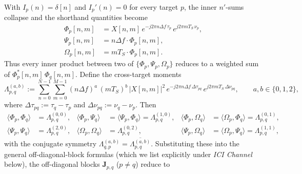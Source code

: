 \documentclass[11pt]{article}
\begin{document}
With \(I_p(n) = \delta[n]\) and \(I_p'(n) = 0\) for every target \(p\), the inner \(n'\)-sums collapse and the shorthand quantities become
\begin{align}
    \Phi_p[n,m]   &= X[n,m]\, e^{-j2\pi n\Delta f\, \tau_p}\, e^{j2\pi mT_S\, \nu_p}, \\
    \Psi_p[n,m]   &= n\Delta f \cdot \Phi_p[n,m], \\
    \Omega_p[n,m] &= mT_S \cdot \Phi_p[n,m].
\end{align}
Thus every inner product between two of \(\{\Phi_p, \Psi_p, \Omega_p\}\) reduces to a weighted sum of \(\Phi_p^*[n,m]\, \Phi_q[n,m]\). Define the cross-target moments
\begin{equation}
    \Lambda_{p,q}^{(a,b)} := \sum_{n=0}^{N-1} \sum_{m=0}^{M-1} (n\Delta f)^a\, (mT_S)^b\, |X[n,m]|^2\, e^{-j2\pi n\Delta f\, \Delta\tau_{pq}}\, e^{j2\pi mT_S\, \Delta\nu_{pq}}, \qquad a, b \in \{0, 1, 2\},
\end{equation}
where \(\Delta\tau_{pq} := \tau_q - \tau_p\) and \(\Delta\nu_{pq} := \nu_q - \nu_p\). Then
\begin{align}
    \langle \Phi_p, \Phi_q \rangle &= \Lambda_{p,q}^{(0,0)}, &
    \langle \Phi_p, \Psi_q \rangle &= \langle \Psi_p, \Phi_q \rangle = \Lambda_{p,q}^{(1,0)}, &
    \langle \Phi_p, \Omega_q \rangle &= \langle \Omega_p, \Phi_q \rangle = \Lambda_{p,q}^{(0,1)}, \\
    \langle \Psi_p, \Psi_q \rangle &= \Lambda_{p,q}^{(2,0)}, &
    \langle \Omega_p, \Omega_q \rangle &= \Lambda_{p,q}^{(0,2)}, &
    \langle \Psi_p, \Omega_q \rangle &= \langle \Omega_p, \Psi_q \rangle = \Lambda_{p,q}^{(1,1)},
\end{align}
with the conjugate symmetry \(\Lambda_{q,p}^{(a,b)} = \overline{\Lambda_{p,q}^{(a,b)}}\). Substituting these into the general off-diagonal-block formulas (which we list explicitly under \emph{ICI Channel} below), the off-diagonal blocks \(\bm{J}_{p,q}\) (\(p \neq q\)) reduce to
\end{document}
